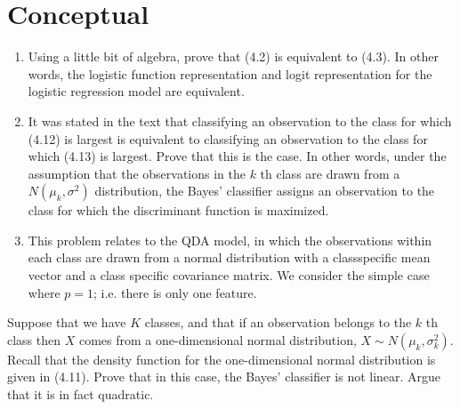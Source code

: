 \documentclass[10pt]{article}
\begin{document}
\section*{Conceptual}
\begin{enumerate}
  \item Using a little bit of algebra, prove that (4.2) is equivalent to (4.3). In other words, the logistic function representation and logit representation for the logistic regression model are equivalent.
  \item It was stated in the text that classifying an observation to the class for which (4.12) is largest is equivalent to classifying an observation to the class for which (4.13) is largest. Prove that this is the case. In other words, under the assumption that the observations in the $k$ th class are drawn from a $N\left(\mu_{k}, \sigma^{2}\right)$ distribution, the Bayes' classifier assigns an observation to the class for which the discriminant function is maximized.
  \item This problem relates to the QDA model, in which the observations within each class are drawn from a normal distribution with a classspecific mean vector and a class specific covariance matrix. We consider the simple case where $p=1$; i.e. there is only one feature.
\end{enumerate}

Suppose that we have $K$ classes, and that if an observation belongs to the $k$ th class then $X$ comes from a one-dimensional normal distribution, $X \sim N\left(\mu_{k}, \sigma_{k}^{2}\right)$. Recall that the density function for the one-dimensional normal distribution is given in (4.11). Prove that in this case, the Bayes' classifier is not linear. Argue that it is in fact quadratic.
\end{document}
